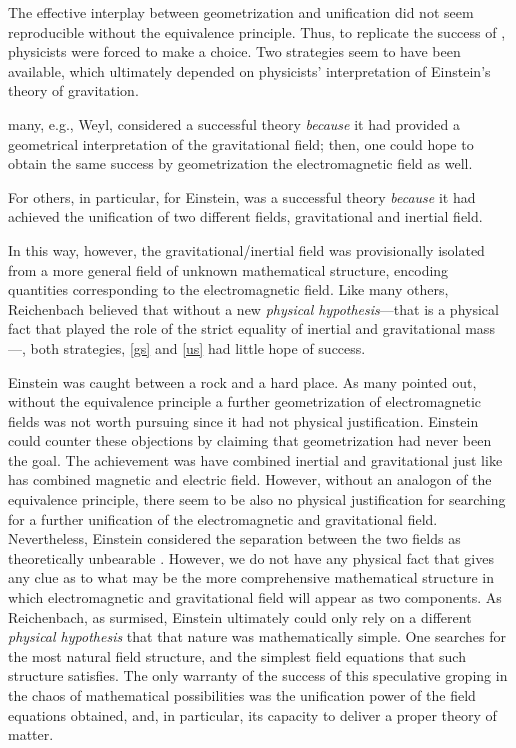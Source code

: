 \documentclass[draft]{article}
\begin{document}
The effective interplay between geometrization and unification did not seem reproducible without the equivalence principle. Thus, to replicate the success of \gr, physicists were forced to make a choice. Two strategies seem to have been available, which ultimately depended on physicists' interpretation of Einstein's theory of gravitation. \begin{inparaenum}[(a)] \item \label{gs} many, e.g., Weyl, considered \gr a successful theory \emph{because} it had provided a geometrical interpretation of the gravitational field; then, one could hope to obtain the same success by geometrization the electromagnetic field as well. \item \label{us} For others, in particular, for Einstein, \gr was a successful theory \emph{because} it had achieved the unification of two different fields, gravitational and inertial field. \end{inparaenum} In this way, however, the gravitational/inertial field was provisionally isolated from a more general field of unknown mathematical structure, encoding quantities corresponding to the electromagnetic field. Like many others, Reichenbach believed that without a new \emph{physical hypothesis}---that is a physical fact that played the role of the strict equality of inertial and gravitational mass---, both strategies, \cref{gs} and \cref{us} had little hope of success.

Einstein was caught between a rock and a hard place. As many pointed out, without the equivalence principle a further geometrization of electromagnetic fields was not worth pursuing since it had not physical justification. Einstein could counter these objections by claiming that geometrization had never been the goal. The achievement \gr was have combined inertial and gravitational just like \sr has combined magnetic and electric field. However, without an analogon of the equivalence principle, there seem to be also no physical justification for searching for a further unification of the electromagnetic and gravitational field. Nevertheless, Einstein considered the separation between the two fields as theoretically unbearable \citep[24]{Einstein1930i}. However, we do not have any physical fact that gives any clue as to what may be the more comprehensive mathematical structure in which electromagnetic and gravitational field will appear as two components. As Reichenbach, as surmised, Einstein ultimately could only rely on a different \emph{physical hypothesis} that that nature was mathematically simple. One searches for the most natural field structure, and the simplest field equations that such structure satisfies. The only warranty of the success of this speculative groping in the chaos of mathematical possibilities was the unification power of the field equations obtained, and, in particular, its capacity to deliver a proper theory of matter.
\end{document}
